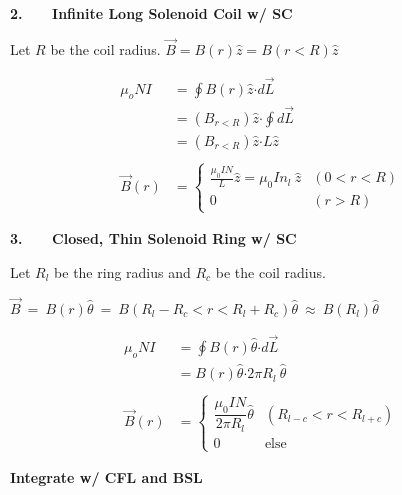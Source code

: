 \documentclass[12pt]{article}
\newcommand{\dotP}{\boldsymbol \cdot}		%
\begin{document}
\begin{minipage}[t]{0.45\textwidth}
	\textbf{2. \ \ \ Infinite Long Solenoid Coil w/ SC}

	\vspace{10pt}
	Let \(R\) be the coil radius. \( \vec{B} = B(r) \hat{z} = B(r<R) \hat{z} \)

	\vspace{10pt}
	\begin{align*}
		\mu_o NI &= \oint B(r) \hat{z} \dotP d\vec{ L }\\
		&= (B_{r<R}) \hat{z} \dotP \oint d\vec{L}\\
		&= (B_{r<R}) \hat{z} \dotP L \hat{z}\\ \\
		\vec{B}(r) &= \begin{cases}
			\frac{\mu_0 I N}{L} \hat{z} = \mu_0 I n_l \ \hat{z} & (0<r<R) \\
			0 & (r>R)
		\end{cases}
	\end{align*}

	\vspace{10pt}
	\textbf{3. \ \ \ Closed, Thin Solenoid Ring w/ SC}

	\vspace{10pt}
	Let \(R_l\) be the ring radius and \(R_c\) be the coil radius.

	\vspace{10pt}
	\( 
		\vec{B} \ = \ B(r) \hat{ \theta } 
		\ = \ B({\scriptstyle R_l-R_c < r < R_l+R_c}) \hat{ \theta } 
		\ \approx \ B( R_l ) \hat{ \theta }
	\)

	\vspace{5pt}
	\begin{align*}
		\mu_o NI &= \oint B(r) \hat{ \theta } \dotP d\vec{ L }\\
		&= B(r) \hat{ \theta } \dotP 2 \pi R_l \ \hat{ \theta }\\ \\
		\vec{B}(r) &= \begin{cases} 
			\dfrac{\mu_0 I N}{2 \pi R_l} \hat{ \theta } & (R_{l-c}<r<R_{l+c}) \\
			0 & \text{else}
		\end{cases}
	\end{align*}
\end{minipage}

%
%
%
\newpage 
\noindent

\textbf{Integrate w/ CFL and BSL}
\end{document}

